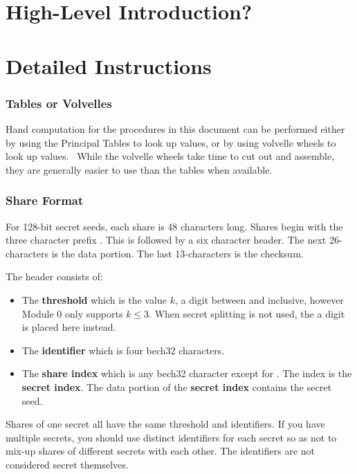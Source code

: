 \documentclass{article}
\newcommand{\tmstrong}[1]{\textbf{#1}}
\newcommand{\tmverbatim}[1]{{\ttfamily{#1}}}
\begin{document}
\part{High-Level Introduction?}\part{Detailed Instructions}

\section{Tables or Volvelles}

Hand computation for the procedures in this document can be performed either
by using the Principal Tables to look up values, or by using volvelle wheels
to look up values. \ While the volvelle wheels take time to cut out and
assemble, they are generally easier to use than the tables when available.

\section{Share Format}

For 128-bit secret seeds, each share is 48 characters long. Shares begin with
the three character prefix \tmverbatim{MS1}. This is followed by a six
character header. The next 26-characters is the data portion. The last
13-characters is the checksum.

The header consists of:
\begin{itemize}
  \item The {\tmstrong{threshold}} which is the value $k$, a digit between
  \tmverbatim{2} and \tmverbatim{9} inclusive, however Module 0 only supports
  $k \leq 3$. When secret splitting is not used, the a \tmverbatim{0} digit is
  placed here instead.
  
  \item The {\tmstrong{identifier}} which is four bech32 characters.
  
  \item The {\tmstrong{share index}} which is any bech32 character except for
  \tmverbatim{S}. The \tmverbatim{S} index is the {\tmstrong{secret index}}.
  The data portion of the {\tmstrong{secret index}} contains the secret seed.
\end{itemize}
Shares of one secret all have the same threshold and identifiers. If you have
multiple secrets, you should use distinct identifiers for each secret so as
not to mix-up shares of different secrets with each other. The identifiers are
not considered secret themselves.
\end{document}
